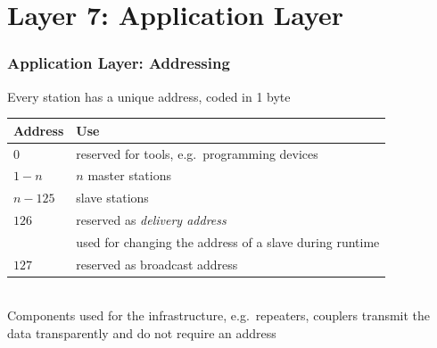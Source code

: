\documentclass{beamer}
\begin{document}
\section{Layer 7: Application Layer}
\begin{frame}
  \frametitle{Application Layer: Addressing}
  Every station has a unique address, coded in 1 byte
  \begin{center}
    \footnotesize
    \begin{tabular}[h]{l|l}
      \textbf{Address}  & \textbf{Use} \\
      \hline
      $0$               & reserved for tools, e.g.\ programming devices \\
      $1 - n$           & $n$ master stations \\
      $n - 125$         & slave stations \\
      $126$             & reserved as \textit{delivery address} \\
                        & used for changing the address of a slave during runtime \\
      $127$             & reserved as broadcast address
    \end{tabular}
    \normalsize
  \end{center}
  \hfill \\
  Components used for the infrastructure, e.g.\ repeaters, couplers transmit the data transparently
  and do not require an address \\
\end{frame}
\end{document}
